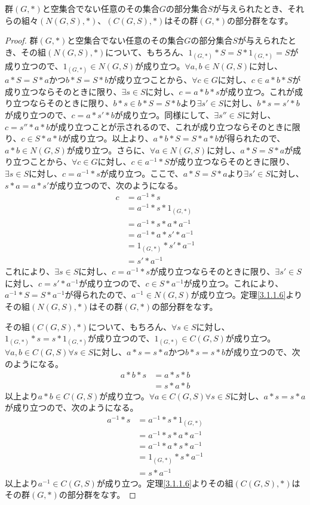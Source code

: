 \documentclass[dvipdfmx]{jsarticle}
\begin{document}
\begin{thm}\label{3.1.1.45}
群$(G,*)$と空集合でない任意のその集合$G$の部分集合$S$が与えられたとき、それらの組々$\left( N(G,S),* \right)$、$\left( C(G,S),* \right)$はその群$(G,*)$の部分群をなす。
\end{thm}
\begin{proof}
群$(G,*)$と空集合でない任意のその集合$G$の部分集合$S$が与えられたとき、その組$\left( N(G,S),* \right)$について、もちろん、$1_{(G,*)}*S = S*1_{(G,*)} = S$が成り立つので、$1_{(G,*)} \in N(G,S)$が成り立つ。$\forall a,b \in N(G,S)$に対し、$a*S = S*a$かつ$b*S = S*b$が成り立つことから、$\forall c \in G$に対し、$c \in a*b*S$が成り立つならそのときに限り、$\exists s \in S$に対し、$c = a*b*s$が成り立つ。これが成り立つならそのときに限り、$b*s \in b*S = S*b$より$\exists s' \in S$に対し、$b*s = s'*b$が成り立つので、$c = a*s'*b$が成り立つ。同様にして、$\exists s'' \in S$に対し、$c = s''*a*b$が成り立つことが示されるので、これが成り立つならそのときに限り、$c \in S*a*b$が成り立つ。以上より、$a*b*S = S*a*b$が得られたので、$a*b \in N(G,S)$が成り立つ。さらに、$\forall a \in N(G,S)$に対し、$a*S = S*a$が成り立つことから、$\forall c \in G$に対し、$c \in a^{- 1}*S$が成り立つならそのときに限り、$\exists s \in S$に対し、$c = a^{- 1}*s$が成り立つ。ここで、$a*S = S*a$より$\exists s' \in S$に対し、$s*a = a*s'$が成り立つので、次のようになる。
\begin{align*}
c &= a^{- 1}*s\\
&= a^{- 1}*s*1_{(G,*)}\\
&= a^{- 1}*s*a*a^{- 1}\\
&= a^{- 1}*a*s'*a^{- 1}\\
&= 1_{(G,*)}*s'*a^{- 1}\\
&= s'*a^{- 1}
\end{align*}
これにより、$\exists s \in S$に対し、$c = a^{- 1}*s$が成り立つならそのときに限り、$\exists s' \in S$に対し、$c = s'*a^{- 1}$が成り立つので、$c \in S*a^{- 1}$が成り立つ。これにより、$a^{- 1}*S = S*a^{- 1}$が得られたので、$a^{- 1} \in N(G,S)$が成り立つ。定理\ref{3.1.1.6}よりその組$\left( N(G,S),* \right)$はその群$(G,*)$の部分群をなす。\par
その組$\left( C(G,S),* \right)$について、もちろん、$\forall s \in S$に対し、$1_{(G,*)}*s = s*1_{(G,*)}$が成り立つので、$1_{(G,*)} \in C(G,S)$が成り立つ。$\forall a,b \in C(G,S)\forall s \in S$に対し、$a*s = s*a$かつ$b*s = s*b$が成り立つので、次のようになる。
\begin{align*}
a*b*s &= a*s*b\\
&= s*a*b
\end{align*}
以上より$a*b \in C(G,S)$が成り立つ。$\forall a \in C(G,S)\forall s \in S$に対し、$a*s = s*a$が成り立つので、次のようになる。
\begin{align*}
a^{- 1}*s &= a^{- 1}*s*1_{(G,*)}\\
&= a^{- 1}*s*a*a^{- 1}\\
&= a^{- 1}*a*s*a^{- 1}\\
&= 1_{(G,*)}*s*a^{- 1}\\
&= s*a^{- 1}
\end{align*}
以上より$a^{- 1} \in C(G,S)$が成り立つ。定理\ref{3.1.1.6}よりその組$\left( C(G,S),* \right)$はその群$(G,*)$の部分群をなす。
\end{proof}
\end{document}
